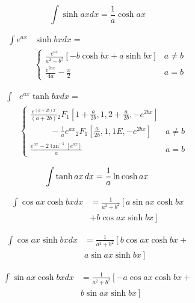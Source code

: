 \documentclass[11pt,twoside]{article}
\begin{document}
\begin{multicols}{3}
\begin{footnotesize}
\begin{equation}
\int \sinh ax dx = \frac{1}{a} \cosh ax 
\end{equation}

\begin{align}
\int e^{ax}& \sinh bx dx = \nonumber \\ &
\begin{cases}
\displaystyle{\frac{e^{ax}}{a^2-b^2} }[ -b \cosh bx + a \sinh bx ]  & a\ne b \\
\displaystyle{\frac{e^{2ax}}{4a} - \frac{x}{2}}  & a = b
\end{cases}
\end{align}

\begin{align}
\int & e^{ax} \tanh bx dx = \nonumber \\ &
\begin{cases}
\displaystyle{ \frac{ e^{(a+2b)x}}{(a+2b)} 
{_2F_1}\left[ 1+\frac{a}{2b},1,2+\frac{a}{2b}, -e^{2bx}\right] }& \\
\displaystyle{
\hspace{1cm}-\frac{1}{a}e^{ax}{_2F_1}\left[ \frac{a}{2b},1,1E, -e^{2bx}\right]
}
 & a\ne b \\
\displaystyle{\frac{e^{ax}-2\tan^{-1}[e^{ax}]}{a} } & a = b
\end{cases}
\end{align}

\begin{equation}
\int  \tanh ax\hspace{1.5pt} dx =\frac{1}{a} \ln \cosh ax 
\end{equation}

\begin{align}
\int \cos ax \cosh bx dx &= 
\frac{1}{a^2 + b^2} \left[
a \sin ax \cosh bx  \right . \nonumber \\ & \left. + b \cos ax \sinh bx
\right] 
\end{align}

\begin{align}
\int \cos ax \sinh bx dx& = 
\frac{1}{a^2 + b^2} \left[
b \cos ax \cosh bx +
\right . \nonumber \\ & \left .
 a \sin ax \sinh bx
\right] 
\end{align}

\begin{align}
\int \sin ax \cosh bx dx &= 
\frac{1}{a^2 + b^2} \left[
-a \cos ax \cosh bx +
\right . \nonumber \\ & \left .
 b \sin ax \sinh bx
\right] 
\end{align}


\end{footnotesize}
\end{multicols}
\end{document}
